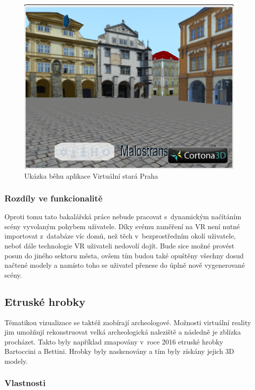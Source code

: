 \documentclass[thesis=B,czech]{FITthesis}[2012/06/26]
\begin{document}
	
	\begin{figure}
  		\includegraphics{vsp.png}
  		\caption{Ukázka běhu aplikace Virtuální stará Praha}
  		\label{fig:vsp1}
	\end{figure}

        \subsubsection{Rozdíly ve funkcionalitě}
        
        Oproti tomu tato bakalářská práce nebude pracovat s~dynamickým načítáním scény vyvolaným pohybem uživatele. Díky svému zaměření na VR není nutné importovat z~databáze víc domů, než těch v~bezprostředním okolí uživatele, neboť dále technologie VR uživateli nedovolí dojít. Bude sice možné provést posun do jiného sektoru města, ovšem tím budou také opuštěny všechny dosud načtené modely a namísto toho se uživatel přenese do úplně nově vygenerované scény.


	
	\subsection{Etruské hrobky}
	
	Tématikou vizualizace se taktéž zaobírají archeologové. Možnosti virtuální reality jim umožňují rekonstruovat velká archeologická naleziště a následně je zblízka procházet. Takto byly například zmapovány v~roce 2016 etruské hrobky Bartoccini a Bettini. Hrobky byly naskenovány a tím byly získány jejich 3D modely. 

        \subsubsection{Vlastnosti}	
	
\end{document}
